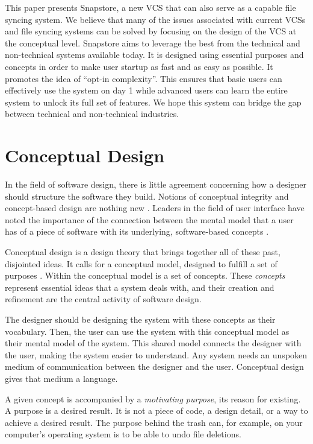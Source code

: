 This paper presents Snapstore, a new VCS that can also serve as a capable file syncing system. We believe that many of the issues associated with current VCSs and file syncing systems can be solved by focusing on the design of the VCS at the conceptual level. Snapstore aims to leverage the best from the technical and non-technical systems available today. It is designed using essential purposes and concepts in order to make user startup as fast and as easy as possible. It promotes the idea of ``opt-in complexity''. This ensures that basic users can effectively use the system on day 1 while advanced users can learn the entire system to unlock its full set of features. We hope this system can bridge the gap between technical and non-technical industries. 

\section{Conceptual Design}

In the field of software design, there is little agreement concerning how a designer should structure the software they build. Notions of conceptual integrity and concept-based design are nothing new \cite{Brooks}. Leaders in the field of user interface have noted the importance of the connection between the mental model that a user has of a piece of software with its underlying, software-based concepts \cite{Norman}. 

Conceptual design is a design theory that brings together all of these past, disjointed ideas. It calls for a conceptual model, designed to fulfill a set of purposes \cite{Jackson}. Within the conceptual model is a set of concepts. These \textit{concepts} represent essential ideas that a system deals with, and their creation and refinement are the central activity of software design.

The designer should be designing the system with these concepts as their vocabulary. Then, the user can use the system with this conceptual model as their mental model of the system. This shared model connects the designer with the user, making the system easier to understand. Any system needs an unspoken medium of communication between the designer and the user. Conceptual design gives that medium a language.

A given concept is accompanied by a \textit{motivating purpose}, its reason for existing. A purpose is a desired result. It is not a piece of code, a design detail, or a way to achieve a desired result. The purpose behind the trash can, for example, on your computer's operating system is to be able to undo file deletions.


